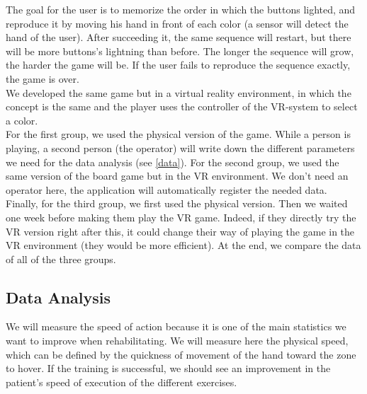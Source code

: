 \documentclass[12pt, openany, twocolumn]{article}
\begin{document}
    The goal for the user is to memorize the order in which the buttons lighted, and reproduce it by moving his hand in front of each color (a sensor will detect the hand of the user).
    After succeeding it, the same sequence will restart, but there will be more buttons's lightning than before.
    The longer the sequence will grow, the harder the game will be.
    If the user fails to reproduce the sequence exactly, the game is over.
    \\

    We developed the same game but in a virtual reality environment, in which the concept is the same and the player uses the controller of the VR-system to select a color.
    \\

    For the first group, we used the physical version of the game.
    While a person is playing, a second person (the operator) will write down the different parameters we need for the data analysis (see \ref{data}).
    For the second group, we used the same version of the board game but in the VR environment.
    We don't need an operator here, the application will automatically register the needed data.
    Finally, for the third group, we first used the physical version. Then we waited one week before making them play the VR game. Indeed, if they directly try the VR version right after this, it could change their way of playing the game in the VR environment (they would be more efficient).
    At the end, we compare the data of all of the three groups.

    \subsection{Data Analysis\label{data}}
    

    
    We will measure the speed of action because it is one of the main statistics we want to improve when rehabilitating. 
    We will measure here the physical speed, which can be defined by the quickness of movement of the hand toward the zone to hover.
    If the training is successful, we should see an improvement in the patient's speed of execution of the different exercises.
    \\
\end{document}
